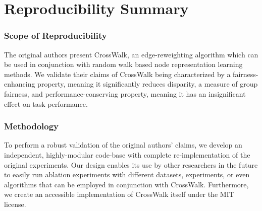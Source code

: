 \section*{\centering Reproducibility Summary}


\subsubsection*{Scope of Reproducibility}
The original authors present CrossWalk, an edge-reweighting algorithm which can be used in conjunction with random walk based node representation learning methods. We validate their claims of CrossWalk being characterized by a fairness-enhancing property, meaning it significantly reduces disparity, a measure of group fairness, and performance-conserving property, meaning it has an insignificant effect on task performance.



\subsubsection*{Methodology}


To perform a robust validation of the original authors' claims, we develop an independent, highly-modular code-base with complete re-implementation of the original experiments. Our design enables its use by other researchers in the future to easily run ablation experiments with different datasets, experiments, or even algorithms that can be employed in conjunction with CrossWalk. Furthermore, we create an accessible implementation of CrossWalk itself under the MIT license.

